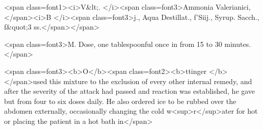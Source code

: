 <span class=font1><i>V&lt;.   </i><span class=font3>Ammonia Valerianici, </span><i>B </i><span class=font3>j.,
Aqua Destillat., f'Siij.,
Syrup. Sacch., f&quot;3 ss.</span></span>

<span class=font3>M.   Dose, one tablespoonful once in from 15 to 30 minutes.</span>

<span class=font3><b>O</b><span class=font2><b>ttinger </b></span>used this mixture to the exclusion of every other internal
remedy, and after the severity of the attack had passed and reaction
was established, he gave but from four to six doses daily. He also
ordered ice to be rubbed over the abdomen externally, occasionally
changing the cold w<sup>r</sup>ater for hot or placing the patient in a hot bath in</span>
